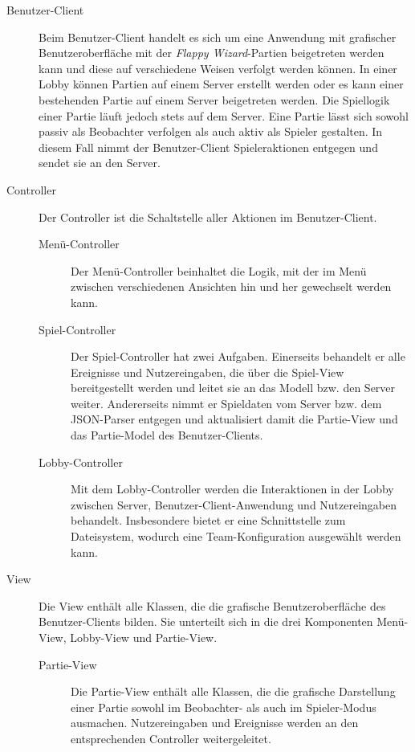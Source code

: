 		\begin{description}
			
			\item[Benutzer-Client]
			Beim Benutzer-Client handelt es sich um eine Anwendung mit grafischer Benutzeroberfläche mit der \textit{Flappy Wizard}-Partien beigetreten werden kann und diese auf verschiedene Weisen verfolgt werden können. In einer Lobby können Partien auf einem Server erstellt werden oder es kann einer bestehenden Partie auf einem Server beigetreten werden. Die Spiellogik einer Partie läuft jedoch stets auf dem Server. Eine Partie lässt sich sowohl passiv als Beobachter verfolgen als auch aktiv als Spieler gestalten. In diesem Fall nimmt der Benutzer-Client Spieleraktionen entgegen und sendet sie an den Server.
			\item[Controller]
			Der Controller ist die Schaltstelle aller Aktionen im Benutzer-Client.			
			
			\begin{description}
				\item[Menü-Controller]
				Der Menü-Controller beinhaltet die Logik, mit der im Menü zwischen verschiedenen Ansichten hin und her gewechselt werden kann.
			
				\item[Spiel-Controller]
				Der Spiel-Controller hat zwei Aufgaben. Einerseits behandelt er alle Ereignisse und Nutzereingaben, die über die Spiel-View bereitgestellt werden und leitet sie an das Modell bzw. den Server weiter. Andererseits nimmt er Spieldaten vom Server bzw. dem JSON-Parser entgegen und aktualisiert damit die Partie-View und das Partie-Model des Benutzer-Clients.
			
			
				\item[Lobby-Controller]
				Mit dem Lobby-Controller werden die Interaktionen in der Lobby zwischen Server, Benutzer-Client-Anwendung und Nutzereingaben behandelt. Insbesondere bietet er eine Schnittstelle zum Dateisystem, wodurch eine Team-Konfiguration ausgewählt werden kann.
			\end{description}
			
			\item[View]
			Die View enthält alle Klassen, die die grafische Benutzeroberfläche des Benutzer-Clients bilden. Sie unterteilt sich in die drei Komponenten Menü-View, Lobby-View und Partie-View.
			\begin{description}
				\item[Partie-View]
				Die Partie-View enthält alle Klassen, die die grafische Darstellung einer Partie sowohl im Beobachter- als auch im Spieler-Modus ausmachen. Nutzereingaben und Ereignisse werden an den entsprechenden Controller weitergeleitet.
			

\end{description}
\end{description}

